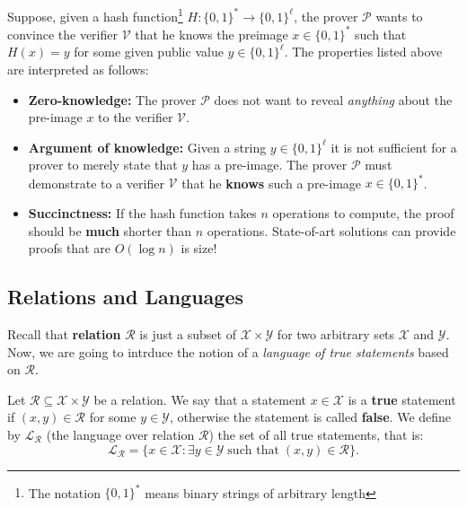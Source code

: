 \documentclass[../lecture-notes.tex]{subfiles}
\begin{document}
\begin{example}
    Suppose, given a hash function\footnote{The notation $\{0,1\}^*$ means binary strings of arbitrary length} $H: \{0,1\}^* \to \{0,1\}^{\ell}$, the prover $\mathcal{P}$ wants to convince the verifier $\mathcal{V}$ that he knows the preimage $x \in \{0,1\}^*$ such that $H(x) = y$ for some given public value $y \in \{0,1\}^{\ell}$. The properties listed above are interpreted as follows:
    \begin{itemize}
        \item \textbf{Zero-knowledge:} The prover $\mathcal{P}$ does not want to reveal \textit{anything} about the pre-image $x$ to the verifier $\mathcal{V}$.
        \item \textbf{Argument of knowledge:} Given a string $y \in \{0,1\}^{\ell}$ it is not sufficient for a prover to merely state that $y$ has a pre-image. The prover $\mathcal{P}$ must demonstrate to a verifier $\mathcal{V}$ that he \textbf{knows} such a pre-image $x \in \{0,1\}^*$.
        \item \textbf{Succinctness:} If the hash function takes $n$ operations to compute, the proof should be \textbf{much} shorter than $n$ operations. State-of-art solutions can provide proofs that are $O(\log n)$ is size!
    \end{itemize}
\end{example}

\subsection{Relations and Languages}
Recall that \textbf{relation} $\mathcal{R}$ is just a subset of $\mathcal{X} \times \mathcal{Y}$ for two arbitrary sets $\mathcal{X}$ and $\mathcal{Y}$. Now, we are going to intrduce the notion of a \emph{language of true statements} based on $\mathcal{R}$.

\begin{definition}
    Let $\mathcal{R} \subseteq \mathcal{X} \times \mathcal{Y}$ be a relation. We say that a statement $x \in \mathcal{X}$ is a \textbf{true} statement if $(x,y) \in \mathcal{R}$ for some $y \in \mathcal{Y}$, otherwise the statement is called \textbf{false}. We define by $\mathcal{L}_{\mathcal{R}}$ (the language over relation $\mathcal{R}$) the set of all true statements, that is:
    \begin{equation*}
        \mathcal{L}_{\mathcal{R}} = \{ x \in \mathcal{X}: \exists y \in \mathcal{Y} \; \text{such that} \; (x,y) \in \mathcal{R} \}.
    \end{equation*}
\end{definition}
\end{document}
